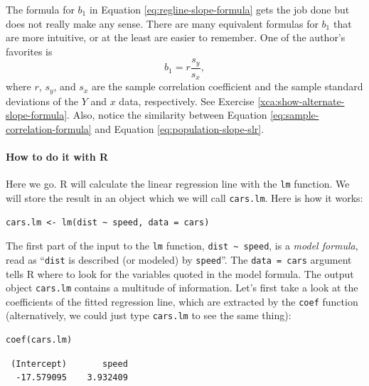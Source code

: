 \documentclass[captions=tableheading]{scrbook}
\begin{document}
\begin{rem}
The formula for \( b_{1} \) in Equation \ref{eq:regline-slope-formula} gets the job done but does not really make any sense. There are many equivalent formulas for \( b_{1} \) that are more intuitive, or at the least are easier to remember. One of the author's favorites is
\begin{equation}
b_{1} = r\frac{s_{y}}{s_{x}},\label{eq:sample-correlation-formula}
\end{equation}
where \(r\), \( s_{y} \), and \( s_{x} \) are the sample correlation coefficient and the sample standard deviations of the \(Y\) and \(x\) data, respectively. See Exercise \ref{xca:show-alternate-slope-formula}. Also, notice the similarity between Equation \ref{eq:sample-correlation-formula} and Equation \ref{eq:population-slope-slr}.
\end{rem}

\paragraph*{How to do it with \textsf{R}}



Here we go. \textsf{R} will calculate the linear regression line with the \texttt{lm} function. We will store the result in an object which we will call \texttt{cars.lm}. Here is how it works:


\begin{verbatim}
cars.lm <- lm(dist ~ speed, data = cars)
\end{verbatim}

The first part of the input to the \texttt{lm} function, \texttt{dist \textasciitilde{} speed}, is a \emph{model formula}, read as ``\texttt{dist} is described (or modeled) by \texttt{speed}''. The \texttt{data = cars} argument tells \textsf{R} where to look for the variables quoted in the model formula. The output object \texttt{cars.lm} contains a multitude of information. Let's first take a look at the coefficients of the fitted regression line, which are extracted by the \texttt{coef} function (alternatively, we could just type \texttt{cars.lm} to see the same thing):


\begin{verbatim}
coef(cars.lm)
\end{verbatim}

\begin{verbatim}
 (Intercept)       speed 
  -17.579095    3.932409
\end{verbatim}
\end{document}
